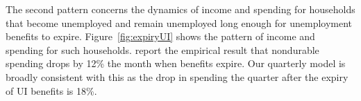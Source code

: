 \documentclass[\latexroot/\projectname]{subfiles}
\begin{document}
\whenintegrated{\label{ganong-noel}}

The second pattern concerns the dynamics of income and spending for households that become unemployed and remain unemployed long enough for unemployment benefits to expire.
Figure~\ref{fig:expiryUI} shows the pattern of income and spending for such households.
\cite{ganongConsumer2019} report the empirical result that nondurable spending drops by 12\% the month when benefits expire.
Our quarterly model is broadly consistent with this as the drop in spending the quarter after the expiry of UI benefits is 18\%.


\smartbib
\end{document}
